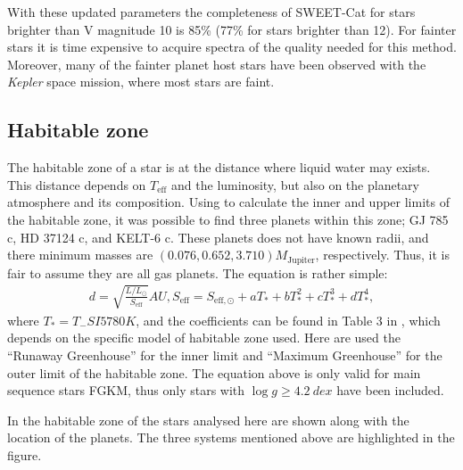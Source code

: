 With these updated parameters the completeness of SWEET-Cat for stars brighter than V magnitude 10
is 85\% (77\% for stars brighter than 12). For fainter stars it is time expensive to acquire spectra
of the quality needed for this method. Moreover, many of the fainter planet host stars have been
observed with the \emph{Kepler} space mission, where most stars are faint.


\subsection{Habitable zone}
\label{sec:HZ}

The habitable zone of a star is at the distance where liquid water may exists. This distance depends
on $T_\mathrm{eff}$ and the luminosity, but also on the planetary atmosphere and its composition.
Using \citet[equation 3 described in][]{Kopparapu2013} to calculate the inner and upper limits of
the habitable zone, it was possible to find three planets within this zone; GJ 785 c, HD 37124 c,
and KELT-6 c. These planets does not have known radii, and there minimum masses are
$(0.076,0.652,3.710)M_\mathrm{Jupiter}$, respectively. Thus, it is fair to assume they are all gas
planets. The equation is rather simple:
\begin{align}
  d = \sqrt{\frac{L/L_\odot}{S_\mathrm{eff}}} \si{AU},
  S_\mathrm{eff} = S_{\mathrm{eff},\odot} + aT_\ast + bT_\ast^2 + cT_\ast^3 + dT_\ast^4,
\end{align}
where $T_\ast=T_\mathrm-SI{5780}{K}$, and the coefficients can be found in Table 3 in
\citet{Kopparapu2013}, which depends on the specific model of habitable zone used. Here are used the
``Runaway Greenhouse'' for the inner limit and ``Maximum Greenhouse'' for the outer limit of the
habitable zone. The equation above is only valid for main sequence stars FGKM, thus only stars with
$\log g\geq\SI{4.2}{dex}$ have been included.

In  the habitable zone of the stars analysed here are shown along with the location of
the planets. The three systems mentioned above are highlighted in the figure.

